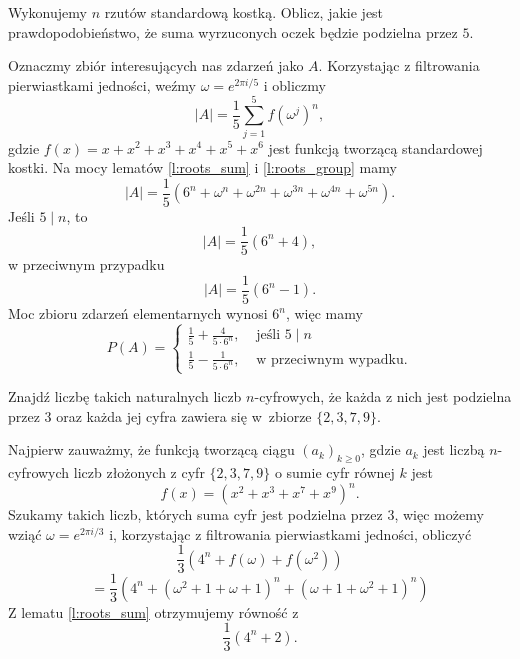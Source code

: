 \documentclass[bibliography=totocnumbered]{scrartcl}
\begin{document}
    \begin{problem}[IMC 1999, B2]
        Wykonujemy $n$ rzutów standardową kostką. Oblicz, jakie jest prawdopodobieństwo, że suma wyrzuconych oczek będzie podzielna przez $5$.
        \begin{answer}
            Oznaczmy zbiór interesujących nas zdarzeń jako $A$. Korzystając z filtrowania pierwiastkami jedności, weźmy $\omega = e^{2\pi i / 5}$ i obliczmy
            $$ |A| = \frac{1}{5}\sum_{j = 1}^5 f(\omega^j)^n, $$
            gdzie $f(x) = x + x^2 + x^3 + x^4 + x^5 + x^6$ jest funkcją tworzącą standardowej kostki. Na mocy lematów \ref{l:roots_sum} i \ref{l:roots_group} mamy
            $$ |A| = \frac{1}{5}\left(6^n + \omega^n + \omega^{2n} + \omega^{3n} + \omega^{4n} + \omega^{5n}\right). $$
            Jeśli $5\mid n$, to
            $$ |A| = \frac{1}{5}\left(6^n + 4\right), $$
            w przeciwnym przypadku
            $$ |A| = \frac{1}{5}\left(6^n - 1\right). $$
            Moc zbioru zdarzeń elementarnych wynosi $6^n$, więc mamy
            $$ P(A) = \begin{cases}\frac{1}{5} + \frac{4}{5\cdot 6^n}, & \text{ jeśli } 5\mid n \\
                                   \frac{1}{5} - \frac{1}{5\cdot 6^n}, & \text{ w przeciwnym wypadku.} \end{cases} $$
        \end{answer}
    \end{problem}

    \begin{problem}
        Znajdź liczbę takich naturalnych liczb $n$-cyfrowych, że każda z nich jest podzielna przez $3$ oraz każda jej cyfra zawiera się w~zbiorze $\{2, 3, 7, 9\}$.
        \begin{answer}
            Najpierw zauważmy, że funkcją tworzącą ciągu $(a_k)_{k\geq 0}$, gdzie $a_k$ jest liczbą $n$-cyfrowych liczb złożonych z cyfr $\{2, 3, 7, 9\}$ o sumie cyfr równej $k$ jest
            $$ f(x) = \left(x^2 + x^3 + x^7 + x^9\right)^n. $$
            Szukamy takich liczb, których suma cyfr jest podzielna przez $3$, więc możemy wziąć $\omega = e^{2\pi i / 3}$ i, korzystając z filtrowania pierwiastkami jedności, obliczyć
            $$ \frac{1}{3}\left(4^n + f(\omega) + f(\omega^2)\right) $$
            $$ = \frac{1}{3}\left(4^n + \left(\omega^2 + 1 + \omega + 1\right)^n + \left(\omega + 1 + \omega^2 + 1\right)^n\right) $$
            Z lematu \ref{l:roots_sum} otrzymujemy równość z
            $$ \frac{1}{3}\left(4^n + 2\right). $$
        \end{answer}
    \end{problem}
\end{document}
